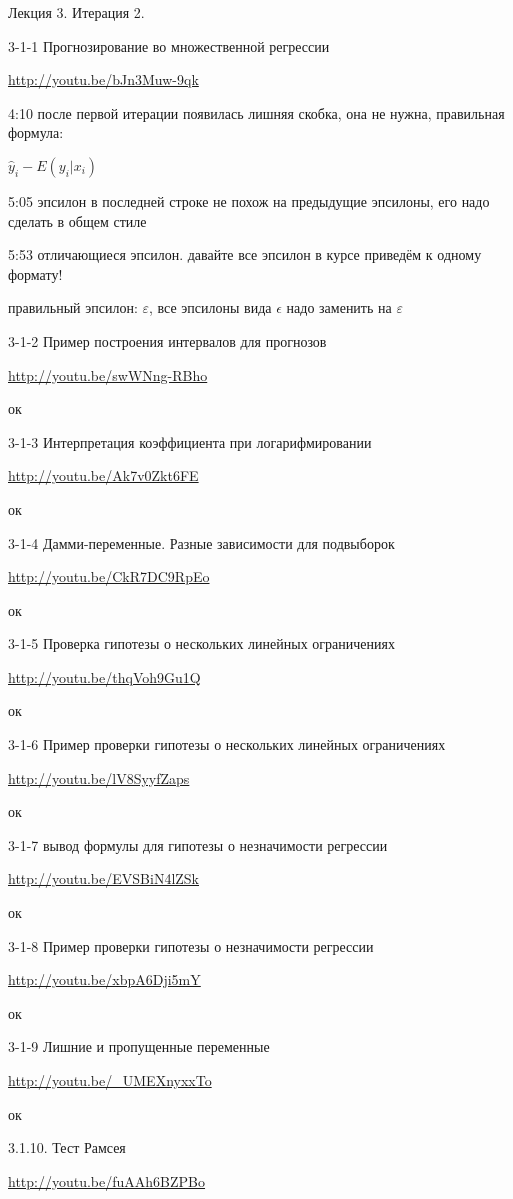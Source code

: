 \documentclass[12pt,a4paper]{article}
\begin{document}
Лекция 3. Итерация 2.

3-1-1 Прогнозирование во множественной регрессии

\url{http://youtu.be/bJn3Muw-9qk}

4:10 после первой итерации появилась лишняя скобка, она не нужна, правильная формула:

$\hat{y}_i - E(y_i|x_i)$

5:05 эпсилон в последней строке не похож на предыдущие эпсилоны, его надо сделать в общем стиле

5:53 отличающиеся эпсилон. давайте все эпсилон в курсе приведём к одному формату!

правильный эпсилон: $\varepsilon$, все эпсилоны вида $\epsilon$ надо заменить на $\varepsilon$

3-1-2 Пример построения интервалов для прогнозов

\url{http://youtu.be/swWNng-RBho}

ок

3-1-3 Интерпретация коэффициента при логарифмировании

\url{http://youtu.be/Ak7v0Zkt6FE}

ок

3-1-4 Дамми-переменные. Разные зависимости для подвыборок

\url{http://youtu.be/CkR7DC9RpEo}

ок

3-1-5 Проверка гипотезы о нескольких линейных ограничениях

\url{http://youtu.be/thqVoh9Gu1Q}

ок

3-1-6 Пример проверки гипотезы о нескольких линейных ограничениях

\url{http://youtu.be/lV8SyyfZaps}

ок

3-1-7 вывод формулы для гипотезы о незначимости регрессии

\url{http://youtu.be/EVSBiN4lZSk}

ок

3-1-8 Пример проверки гипотезы о незначимости регрессии 

\url{http://youtu.be/xbpA6Dji5mY}

ок

3-1-9 Лишние и пропущенные переменные

\url{http://youtu.be/_UMEXnyxxTo}

ок

3.1.10. Тест Рамсея

\url{http://youtu.be/fuAAh6BZPBo}
\end{document}
